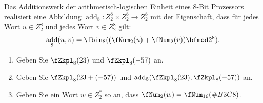\documentclass[12pt]{article}
\DeclareMathOperator{\add}{add}
\begin{document}


\begin{aufgabe}[2 + 2 + 2 = 6]
  Das Additionswerk der arithmetisch-logischen Einheit eines $8$-Bit Prozessors
  realisiert eine Abbildung $\add_8 \colon Z_2^8 \times Z_2^8 \to Z_2^8$ mit
  der Eigenschaft, dass für jedes Wort $u \in Z_2^8$ und jedes Wort
  $v \in Z_2^8$ gilt:
  \begin{equation*}
    \add_8(u, v) = \fbin_8((\fNum_2(u) + \fNum_2(v)) \bfmod 2^8).
  \end{equation*}
  \begin{enumerate}
    \item Geben Sie $\fZkpl_8(23)$ und $\fZkpl_8(-57)$ an.
    \item Geben Sie $\fZkpl_8(23 + (-57))$ und $\add_8(\fZkpl_8(23), \fZkpl_8(-57))$ an.
    \item Geben Sie ein Wort $w \in Z_2^*$ so an, dass $\fNum_2(w) = \fNum_{16}(\#{B3C8})$. %
  \end{enumerate}
\end{aufgabe}
\end{document}
